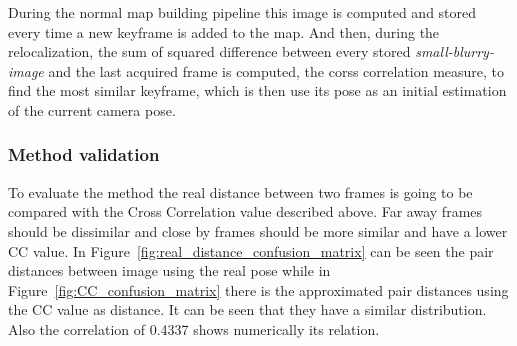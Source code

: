 During the normal map building pipeline this image is computed and stored every time a new keyframe is added to the map. And then, during the relocalization, the sum of squared difference between every stored \textit{small-blurry-image} and the last acquired frame is computed, the corss correlation measure, to find the most similar keyframe, which is then use its pose as an initial estimation of the current camera pose.\\

\subsubsection{Method validation}
\label{ssub:cc_method_validation}

To evaluate the method the real distance between two frames is going to be compared with the Cross Correlation value described above. Far away frames should be dissimilar and close by frames should be more similar and have a lower CC value. In Figure~\ref{fig:real_distance_confusion_matrix} can be seen the pair distances between image using the real pose while in Figure~\ref{fig:CC_confusion_matrix} there is the approximated pair distances using the CC value as distance. It can be seen that they have a similar distribution. Also the correlation of 0.4337 shows numerically its relation.\\

